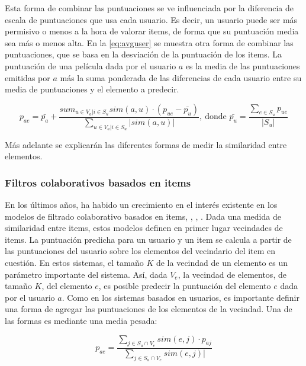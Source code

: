 Esta forma de combinar las puntuaciones se ve influenciada por la diferencia de escala de puntuaciones que usa cada usuario. Es decir, un usuario puede ser más permisivo o menos a la hora de valorar items, de forma que su puntuación media sea más o menos alta. En la \autoref{eq:avguser} se muestra otra forma de combinar las puntuaciones, que se basa en la desviación de la puntuación de los items. La puntuación de una película dada por el usuario $a$ es la media de las puntuaciones emitidas por $a$ más la suma ponderada de las diferencias de cada usuario entre su media de puntuaciones y el elemento a predecir.

\begin{equation}
    p_{ae} = \bar{p_a} + \frac{sum_{u\in V_a | i \in S_u}{sim\left(a, u\right)\cdot \left(p_{ue}-\bar{p_u}\right)}}{\sum_{u\in V_a | i \in S_u}{|sim\left(a, u\right)|}},\ \text{donde } \bar{p_u} = \frac{\sum_{e\in S_u}{p_{ue}}}{|S_u|}
    \label{eq:avguser}
\end{equation}


Más adelante se explicarán las diferentes formas de medir la similaridad entre elementos.

\subsubsection{Filtros colaborativos basados en items}

En los últimos años, ha habido un crecimiento en el interés existente en los modelos de filtrado colaborativo basados en items, \cite{Amazon}, \cite{sarwar}, \cite{karypis}. Dada una medida de similaridad entre items, estos modelos definen en primer lugar vecindades de items. La puntuación predicha para un usuario y un item se calcula a partir de las puntuaciones del usuario sobre los elementos del vecindario del item en cuestión. En estos sistemas, el tamaño $K$ de la vecindad de un elemento es un parámetro importante del sistema. Así, dada $V_e$, la vecindad de elementos, de tamaño $K$, del elemento $e$, es posible predecir la puntuación del elemento $e$ dada por el usuario $a$. Como en los sistemas basados en usuarios, es importante definir una forma de agregar las puntuaciones de los elementos de la vecindad. Una de las formas es mediante una media pesada:

\begin{equation}
    p_{ae} = \frac{\sum_{j \in S_a \cap V_e}{sim\left(e, j\right) \cdot p_{aj}}}{\sum_{j \in S_a \cap V_e}{sim\left(e, j\right)|}}
    \label{eq:itembased}
\end{equation}

